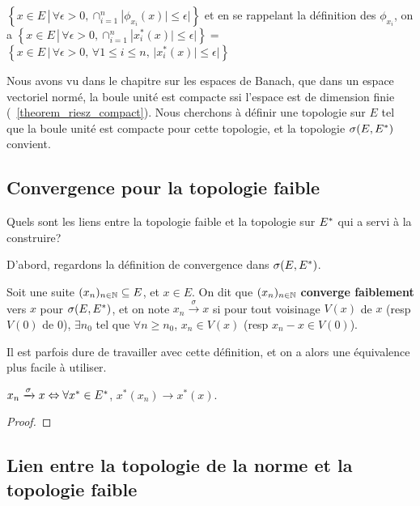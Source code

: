 $\left\{ x \in E \, | \, \forall \epsilon > 0, \cap_{i = 1}^{n}|\phi_{x_{i}}(x)| \leq \epsilon| \right\}$
et en se rappelant la définition des $\phi_{x_{i}}$, on a
$\left\{ x \in E \, | \, \forall \epsilon > 0, \cap_{i = 1}^{n}|x_{i}^{*}(x)| \leq
\epsilon| \right\} = $
$\left\{ x \in E \, | \, \forall \epsilon > 0, \, \forall 1 \leq i \leq n, \, |x_{i}^{*}(x)| \leq \epsilon| \right\}$

Nous avons vu dans le chapitre sur les espaces de Banach, que dans un espace
vectoriel normé, la boule unité est compacte ssi l'espace est de dimension
finie (~\ref{theorem_riesz_compact}). Nous cherchons à définir une topologie sur
$E$ tel que la boule unité est compacte pour cette topologie, et la topologie
$\sigma(E, E^{*})$ convient.

\subsection{Convergence pour la topologie faible}
Quels sont les liens entre la topologie faible et la topologie sur $E^{*}$
qui a servi à la construire?

D'abord, regardons la définition de convergence dans $\sigma(E, E^{*})$.
\begin{definition}
	Soit une suite $(x_{n})_{n \in \mathbb{N}} \subseteq E$, et $x \in E$.
	On dit que $(x_{n})_{n \in \mathbb{N}}$ \textbf{converge faiblement} vers $x$
	pour $\sigma(E, E^{*})$, et on note $x_{n} \xrightarrow{\sigma} x$ si pour tout
	voisinage $V(x)$ de $x$ (resp $V(0)$ de $0$), $\exists n_{0}$ tel que
	$\forall n \geq n_{0}$, $x_{n} \in V(x)$ (resp $x_{n} - x \in V(0)$).
\end{definition}

Il est parfois dure de travailler avec cette définition, et on a alors une
équivalence plus facile à utiliser.

\begin{proposition}
	$x_{n} \xrightarrow{\sigma} x \Leftrightarrow \forall x^{*} \in E^{*}$,
	$x^{*}(x_{n}) \rightarrow x^{*}(x)$.
\end{proposition}

\begin{proof}

\end{proof}

\subsection{Lien entre la topologie de la norme et la topologie faible}

